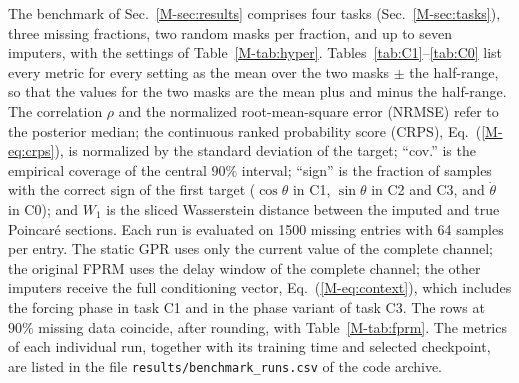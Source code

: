 \documentclass[10pt,letterpaper]{article}
\newcommand{\mref}[1]{\ref{M-#1}}
\begin{document}
The benchmark of Sec.~\mref{sec:results} comprises four tasks (Sec.~\mref{sec:tasks}), three missing fractions, two random masks per fraction, and up to seven imputers, with the settings of Table~\mref{tab:hyper}. Tables~\ref{tab:C1}--\ref{tab:C0} list every metric for every setting as the mean over the two masks $\pm$ the half-range, so that the values for the two masks are the mean plus and minus the half-range. The correlation $\rho$ and the normalized root-mean-square error (NRMSE) refer to the posterior median; the continuous ranked probability score (CRPS), Eq.~(\mref{eq:crps}), is normalized by the standard deviation of the target; ``cov.'' is the empirical coverage of the central $90\%$ interval; ``sign'' is the fraction of samples with the correct sign of the first target ($\cos\theta$ in C1, $\sin\theta$ in C2 and C3, and $\dot\theta$ in C0); and $W_1$ is the sliced Wasserstein distance between the imputed and true Poincar\'e sections. Each run is evaluated on 1500 missing entries with 64 samples per entry. The static GPR uses only the current value of the complete channel; the original FPRM uses the delay window of the complete channel; the other imputers receive the full conditioning vector, Eq.~(\mref{eq:context}), which includes the forcing phase in task C1 and in the phase variant of task C3. The rows at $90\%$ missing data coincide, after rounding, with Table~\mref{tab:fprm}. The metrics of each individual run, together with its training time and selected checkpoint, are listed in the file \texttt{results/benchmark\_runs.csv} of the code archive.

\begin{table}[!htbp]
\caption{Task C1: collar height and angular velocity, $(c,\dot\theta)$, reconstructed from the complete spring force $s$ on the chaotic attractor. The correlation, NRMSE, CRPS, and coverage are averaged over the two targets.}
\label{tab:C1}
\centering\footnotesize\setlength{\tabcolsep}{4pt}

\end{table}

\begin{table}[!htbp]
\caption{Task C2: spring force $s$ reconstructed from the complete collar height $c$ of the undriven, stochastic PIAR (Langevin dynamics). The target is not identifiable by symmetry from the delay window of $c$ alone. At $90\%$ missing data the original FPRM and GPR (full context) converge to the same noise-dominated predictor, hence their identical rows.}
\label{tab:C2}
\centering\footnotesize\setlength{\tabcolsep}{5pt}

\end{table}
\end{document}
